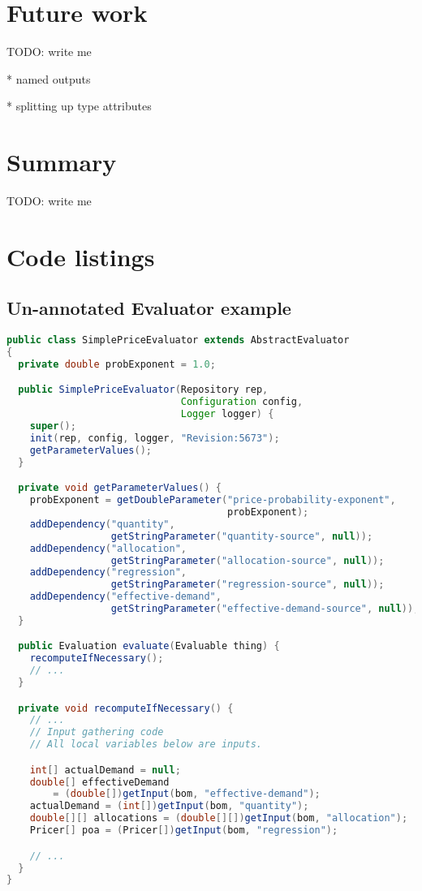 \documentclass{article}
\begin{document}
\section{Future work}

TODO:  write me

* named outputs

* splitting up type attributes

\section{Summary}

TODO:  write me

\clearpage



\clearpage
\appendix

\section{Code listings}

\subsection{Un-annotated Evaluator example}
\label{sec:unannotatedeval}

{\small
\begin{lstlisting}[language={Java}]
public class SimplePriceEvaluator extends AbstractEvaluator
{
  private double probExponent = 1.0;

  public SimplePriceEvaluator(Repository rep,
                              Configuration config,
                              Logger logger) {
    super();
    init(rep, config, logger, "Revision:5673");
    getParameterValues();
  }

  private void getParameterValues() {
    probExponent = getDoubleParameter("price-probability-exponent",
                                      probExponent);
    addDependency("quantity",
                  getStringParameter("quantity-source", null));
    addDependency("allocation",
                  getStringParameter("allocation-source", null));
    addDependency("regression",
                  getStringParameter("regression-source", null));
    addDependency("effective-demand",
                  getStringParameter("effective-demand-source", null));
  }

  public Evaluation evaluate(Evaluable thing) {
    recomputeIfNecessary();
    // ...
  }

  private void recomputeIfNecessary() {
    // ...
    // Input gathering code
    // All local variables below are inputs.

    int[] actualDemand = null;
    double[] effectiveDemand
        = (double[])getInput(bom, "effective-demand");
    actualDemand = (int[])getInput(bom, "quantity");
    double[][] allocations = (double[][])getInput(bom, "allocation");
    Pricer[] poa = (Pricer[])getInput(bom, "regression");

    // ...
  }
}
\end{lstlisting}
}
\end{document}
